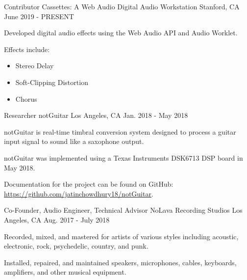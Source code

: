\begin{cventries}
    \cventry
    {Contributor} %
    {Cassettes: A Web Audio Digital Audio Workstation} %
    {Stanford, CA} %
    {June 2019 - PRESENT} %
    {
      \begin{cvitems} %
        \item {Developed digital audio effects using the Web Audio API and Audio Worklet.}
        \item {Effects include:}
        \begin{itemize}
            \item {Stereo Delay}
            \item {Soft-Clipping Distortion}
            \item {Chorus}
        \end{itemize}
      \end{cvitems}
    }

    \cventry
    {Researcher} %
    {notGuitar} %
    {Los Angeles, CA} %
    {Jan. 2018 - May 2018} %
    {
      \begin{cvitems} %
        \item {notGuitar is real-time timbral conversion system designed to process a guitar input signal to sound like a saxophone output.}
        \item {notGuitar was implemented using a Texas Instruments DSK6713 DSP board in May 2018.}
        \item {Documentation for the project can be found on GitHub: \url{https://github.com/jatinchowdhury18/notGuitar}.}
      \end{cvitems}
    }

    \cventry
    {Co-Founder, Audio Engineer, Technical Advisor} %
    {NoLava Recording Studios} %
    {Los Angeles, CA} %
    {Aug. 2017 - July 2018} %
    {
      \begin{cvitems} %
        \item {Recorded, mixed, and mastered for artists of various styles including acoustic, electronic, rock, psychedelic, country, and punk.}
        \item {Installed, repaired, and maintained speakers, microphones, cables, keyboards, amplifiers, and other musical equipment.}
      \end{cvitems}
    }

\end{cventries}
